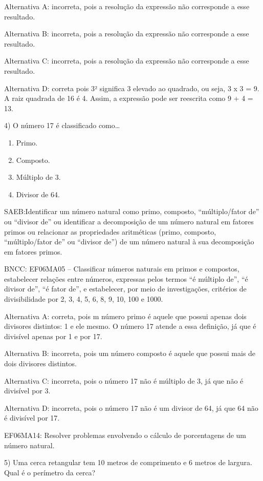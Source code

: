 Alternativa A: incorreta, pois a resolução da expressão não corresponde
a esse resultado.

Alternativa B: incorreta, pois a resolução da expressão não corresponde
a esse resultado.

Alternativa C: incorreta, pois a resolução da expressão não corresponde
a esse resultado.

Alternativa D: correta pois 3² significa 3 elevado ao quadrado, ou seja,
3 x 3 = 9. A raiz quadrada de 16 é 4. Assim, a expressão pode ser
reescrita como 9 + 4 = 13.

4) O número 17 é classificado como\ldots{}

\begin{enumerate}
\def\labelenumi{\alph{enumi})}
\item
  Primo.
\item
  Composto.
\item
  Múltiplo de 3.
\item
  Divisor de 64.
\end{enumerate}

SAEB:Identificar um número natural como primo, composto,
``múltiplo/fator de'' ou ``divisor de'' ou identificar a decomposição de
um número natural em fatores primos ou relacionar as propriedades
aritméticas (primo, composto, ``múltiplo/fator de'' ou ``divisor de'')
de um número natural à sua decomposição em fatores primos.

BNCC: EF06MA05 -- Classificar números naturais em primos e compostos,
estabelecer relações entre números, expressas pelos termos ``é múltiplo
de'', ``é divisor de'', ``é fator de'', e estabelecer, por meio de
investigações, critérios de divisibilidade por 2, 3, 4, 5, 6, 8, 9, 10,
100 e 1000.

Alternativa A: correta, pois m número primo é aquele que possui apenas
dois divisores distintos: 1 e ele mesmo. O número 17 atende a essa
definição, já que é divisível apenas por 1 e por 17.

Alternativa B: incorreta, pois um número composto é aquele que possui
mais de dois divisores distintos.

Alternativa C: incorreta, pois o número 17 não é múltiplo de 3, já que
não é divisível por 3.

Alternativa D: incorreta, pois o número 17 não é um divisor de 64, já
que 64 não é divisível por 17.

EF06MA14: Resolver problemas envolvendo o cálculo de porcentagens de um
número natural.

5) Uma cerca retangular tem 10 metros de comprimento e 6 metros de
largura. Qual é o perímetro da cerca?

